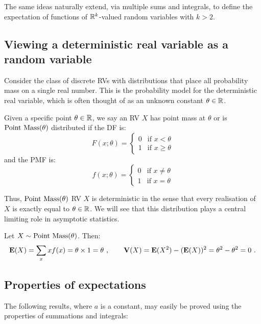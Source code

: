 The same ideas naturally extend, via multiple sums and integrals, to define the expectation of functions of $\mathbb{R}^k$-valued random variables with $k>2$.


\subsection*{Viewing a deterministic real variable as a random variable}

Consider the class of discrete RVs with distributions that place all probability mass on a single real number.  
This is the probability model for the deterministic real variable, which is often thought of as an unknown constant $\theta \in \mathbb{R}$.
\begin{model}[$\pointmass(\theta)$]
Given a specific point $\theta \in \mathbb{R}$, we say an RV $X$ has point mass at $\theta$ or is $\pointmass(\theta)$ distributed if the DF is:
\begin{equation}\label{E:PointMasscdf}
F(x;\theta) =
\begin{cases}
0 & \text{if $x < \theta$} \\
1 & \text{if $x \geq \theta$}
\end{cases}
\end{equation}
and the PMF is:
\begin{equation}
f(x;\theta) =
\begin{cases}
0 & \text{if  $x \neq \theta$} \\
1 & \text{if $x = \theta$}
\end{cases}
\end{equation}
\end{model}
Thus, $\pointmass(\theta)$ RV $X$ is deterministic in the sense that every realisation of $X$ is exactly equal to $\theta \in \mathbb{R}$.  We will see that this distribution plays a central limiting role in asymptotic statistics.

\begin{example}
Let $X \sim \mbox{{\rm Point~Mass}}(\theta)$.  Then:
\[
\mathbf{E}(X) = \sum_{x} x f(x) = \theta \times 1 = \theta \ , \qquad
\mathbf{V}(X) = \mathbf{E}(X^2) - (\mathbf{E}(X))^2 = \theta^2 - \theta^2 = 0 \ .
\]
\end{example}

\subsection{Properties of expectations}\label{S:PropOfEs}
The following results, where $a$ is a  constant, may easily be
proved using the properties of summations and integrals:

